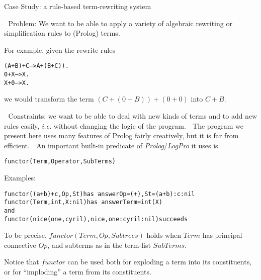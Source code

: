 \documentclass{popl}
\newenvironment{smalltt}{\begin{alltt}\smaller}{\end{alltt}}
\newcommand{\rmbox}[1]{\mbox{{\rm #1}}}
\def\LogPro{{\ttfamily\slshape LogPro}\xspace}
\def\Prolog{{\ttfamily\slshape Prolog}\xspace}
\begin{document}
\begin{foil} 
\begin{cframed}
Case Study: a rule-based term-rewriting system
\end{cframed}

Problem: We want to be able to apply a variety of algebraic
rewriting or simplification rules to (Prolog) terms.

For example, given the rewrite rules
\begin{smalltt}
        (A+B)+C --> A+(B+C)).
        0+X     --> X.
        X+0     --> X.
\end{smalltt}

we would transform the term $(C+(0+B))+(0+0)$ into $C+B$.


Constraints: we want to be able to deal with new kinds of terms and 
to add new rules easily, {\it i.e.\/} without changing the logic of the program.  

The program we present here uses many features of Prolog fairly creatively, 
but it is far from efficient.

An important built-in predicate of \Prolog/\LogPro it uses is
\begin{smalltt}
        functor(Term, Operator, SubTerms)
\end{smalltt}

Examples:
\begin{smalltt}
     functor((a+b)+c, Op, St)     \rmbox{has answer} Op=(+), St=(a+b):c:nil
     functor(Term,    int, X:nil) \rmbox{has answer} Term=int(X)
\rmbox{and}
     functor(nice(one, cyril), nice, one:cyril:nil) \rmbox{succeeds}
\end{smalltt}
\begin{note}
To be precise, $functor(Term, Op, Subtrees)$ holds when $Term$ has 
principal connective $Op$, and subterms as in the term-list $SubTerms$. 

Notice that $functor$ can be used both for exploding a term into its constituents, or
for ``imploding'' a term from its constituents.
\end{note}
\end{foil}
\end{document}
